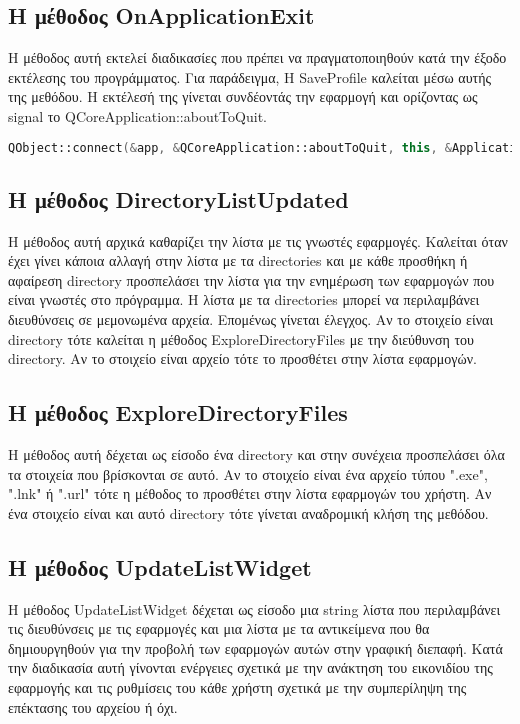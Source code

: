 \subsection{Η μέθοδος OnApplicationExit}
Η μέθοδος αυτή εκτελεί διαδικασίες που πρέπει να πραγματοποιηθούν κατά την έξοδο εκτέλεσης
του προγράμματος. Για παράδειγμα, Η SaveProfile καλείται μέσω αυτής της μεθόδου. Η εκτέλεσή
της γίνεται συνδέοντάς την εφαρμογή και ορίζοντας ως signal το QCoreApplication::aboutToQuit.

\begin{lstlisting}[language=C++, style=cppstyle]
QObject::connect(&app, &QCoreApplication::aboutToQuit, this, &ApplicationExplorer::OnApplicationExit);
\end{lstlisting}

\subsection{Η μέθοδος DirectoryListUpdated}
Η μέθοδος αυτή αρχικά καθαρίζει την λίστα με τις γνωστές εφαρμογές. Καλείται όταν έχει γίνει
κάποια αλλαγή στην λίστα με τα directories και με κάθε προσθήκη ή αφαίρεση directory προσπελάσει
την λίστα για την ενημέρωση των εφαρμογών που είναι γνωστές στο πρόγραμμα. Η λίστα με τα directories
μπορεί να περιλαμβάνει διευθύνσεις σε μεμονωμένα αρχεία. Επομένως γίνεται έλεγχος. Αν το στοιχείο
είναι directory τότε καλείται η μέθοδος ExploreDirectoryFiles με την διεύθυνση του directory. Αν
το στοιχείο είναι αρχείο τότε το προσθέτει στην λίστα εφαρμογών.


\subsection{Η μέθοδος ExploreDirectoryFiles}
Η μέθοδος αυτή δέχεται ως είσοδο ένα directory και στην συνέχεια προσπελάσει όλα
τα στοιχεία που βρίσκονται σε αυτό. Αν το στοιχείο είναι ένα αρχείο τύπου ".exe", ".lnk"
ή ".url" τότε η μέθοδος το προσθέτει στην λίστα εφαρμογών του χρήστη. Αν ένα στοιχείο 
είναι και αυτό directory τότε γίνεται αναδρομική κλήση της μεθόδου.


\subsection{Η μέθοδος UpdateListWidget}
Η μέθοδος UpdateListWidget δέχεται ως είσοδο μια string λίστα που περιλαμβάνει τις
διευθύνσεις με τις εφαρμογές και μια λίστα με τα αντικείμενα που θα δημιουργηθούν
για την προβολή των εφαρμογών αυτών στην γραφική διεπαφή. Κατά την διαδικασία αυτή
γίνονται ενέργειες σχετικά με την ανάκτηση του εικονιδίου της εφαρμογής και τις
ρυθμίσεις του κάθε χρήστη σχετικά με την συμπερίληψη της επέκτασης του αρχείου ή όχι.

